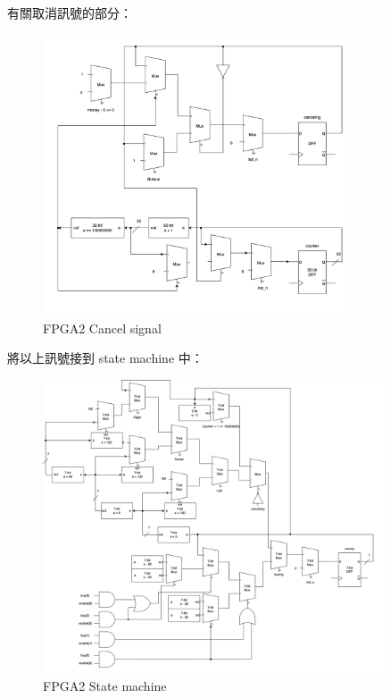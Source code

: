 \documentclass[10.5pt,compsoc,UTF8]{CjC}
\theoremstyle{mystyle}
\begin{document}
有關取消訊號的部分：

\begin{figure}[h!]
  \centering
  \includegraphics[width=0.8\textwidth]{./img/FPGA2-counter.png}
  \caption{FPGA2 Cancel signal}
  \label{fig:FPGA2-cancel}
\end{figure}

\newpage

將以上訊號接到 state machine 中：

\begin{figure}[h!]
  \centering
  \includegraphics[width=0.9\textwidth]{./img/FPGA2-machine.png}
  \caption{FPGA2 State machine}
  \label{fig:FPGA2-state} 
\end{figure}
\end{document}

